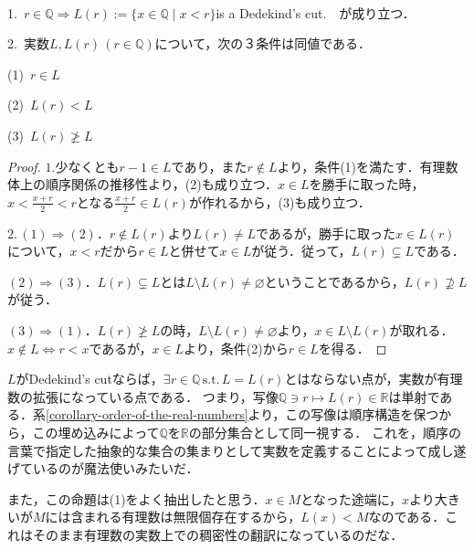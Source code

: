 \documentclass[uplatex, 12pt, dvipdfmx]{jsreport}
\begin{document}
\begin{proposition}\rm{}\label{prop-order-of-the-real-numbers}　

    1.\, $r\in\mathbb{Q}\Rightarrow L(r):=\{ x\in\mathbb{Q}\mid x<r \}$is a Dedekind's cut.　が成り立つ．

    2.\, 実数$L, L(r)\,(r\in\mathbb{Q})$について，次の３条件は同値である．


    (1)\, $r\in L$

    (2)\, $L(r)< L$

    (3)\, $L(r)\ngeq L$
\end{proposition}
\begin{proof}\rm{}
    $1.$少なくとも$r-1\in L$であり，また$r\notin L$より，条件(1)を満たす．有理数体上の順序関係の推移性より，(2)も成り立つ．$x\in L$を勝手に取った時，$x<\frac{x+r}{2}<r$となる$\frac{x+r}{2}\in L(r)$が作れるから，(3)も成り立つ．

    $2.\,(1)\Rightarrow(2)$．$r\notin L(r)$より$L(r)\neq L$であるが，勝手に取った$x\in L(r)$について，$x<r$だから$r\in L$と併せて$x\in L$が従う．従って，$L(r)\subsetneq L$である．

    $(2)\Rightarrow(3)$．$L(r)\subsetneq L$とは$L\setminus L(r)\neq\varnothing$ということであるから，$L(r)\nsupseteq L$が従う．

    $(3)\Rightarrow(1)$．$L(r)\ngeq L$の時，$L\setminus L(r)\neq\varnothing$より，$x\in L\setminus L(r)$が取れる．$x\notin L \Leftrightarrow r<x$であるが，$x\in L$より，条件(2)から$r\in L$を得る．
\end{proof}
\begin{remark}\rm{}
    $L$がDedekind's cutならば，$\exists r\in\mathbb{Q}\,\mathrm{s.t.}\, L=L(r)$とはならない点が，実数が有理数の拡張になっている点である．
    つまり，写像$\mathbb{Q}\ni r\mapsto L(r)\in\mathbb{R}$は単射である．系\ref{corollary-order-of-the-real-numbers}より，この写像は順序構造を保つから，この埋め込みによって$\mathbb{Q}$を$\mathbb{R}$の部分集合として同一視する．
    これを，順序の言葉で指定した抽象的な集合の集まりとして実数を定義することによって成し遂げているのが魔法使いみたいだ．

    また，この命題は(1)をよく抽出したと思う．$x\in M$となった途端に，$x$より大きいが$M$には含まれる有理数は無限個存在するから，$L(x)<M$なのである．これはそのまま有理数の実数上での稠密性の翻訳になっているのだな．
\end{remark}
\end{document}
